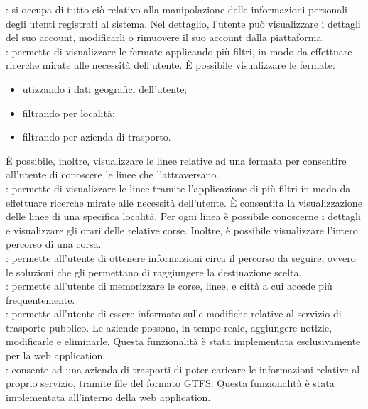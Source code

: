 : si occupa di tutto ci\`{o} relativo alla manipolazione delle informazioni personali degli utenti registrati al sistema. Nel dettaglio, l'utente può visualizzare i dettagli del suo account, modificarli o rimuovere il suo account dalla piattaforma.\\

: permette di visualizzare le fermate applicando pi\`{u} filtri, in modo da effettuare ricerche mirate alle necessità dell'utente. \`{E} possibile visualizzare le fermate:
\begin{itemize}
\item utizzando i dati geografici dell'utente;
\item filtrando per località;
\item filtrando per azienda di trasporto.
\end{itemize}
\`{E} possibile, inoltre, visualizzare le linee relative ad una fermata per consentire all'utente di conoscere le linee che l'attraversano.\\

: permette di visualizzare le linee tramite l\rq applicazione di pi\`{u} filtri in modo da effettuare ricerche mirate alle necessità dell'utente. \`{E} consentita la visualizzazione delle linee di una specifica localit\`{a}. Per ogni linea \`{e} possibile conoscerne i dettagli e visualizzare gli orari delle relative corse. Inoltre, \`{e} possibile visualizzare l'intero percorso di una corsa.\\

: permette all'utente di ottenere informazioni circa il percorso da seguire, ovvero le soluzioni che gli permettano di raggiungere la destinazione scelta.\\

: permette all'utente di memorizzare le corse, linee, e citt\`{a} a cui accede pi\`{u} frequentemente.\\

: permette all'utente di essere informato sulle modifiche relative al servizio di trasporto pubblico. Le aziende possono, in tempo reale, aggiungere notizie, modificarle e eliminarle. Questa funzionalit\`{a} \`{e} stata implementata esclusivamente per la web application.\\

: consente ad una azienda di trasporti di poter caricare le informazioni relative al proprio servizio, tramite file del formato GTFS. Questa funzionalit\`{a} \`{e} stata implementata all'interno della web application.\\

